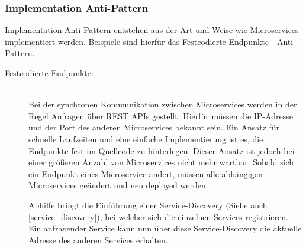 \subsubsection*{Implementation Anti-Pattern}


Implementation Anti-Pattern entstehen aus der Art und Weise wie Microservices implementiert werden. Beispiele sind hierfür das \glqq Festcodierte Endpunkte\grqq{} - Anti-Pattern.

\begin{description}




    
    
    \item[Festcodierte Endpunkte:]\hfill \\
    Bei der synchronen Kommunikation zwischen Microservices werden in der Regel Anfragen über REST APIs gestellt. Hierfür müssen die IP-Adresse und der Port des anderen Microservices bekannt sein. Ein Ansatz für schnelle Laufzeiten und eine einfache Implementierung ist es, die Endpunkte fest im Quellcode zu hinterlegen. Dieser Ansatz ist jedoch bei einer größeren Anzahl von Microservices nicht mehr wartbar. Sobald sich ein Endpunkt eines Microservice ändert, müssen alle abhängigen Microservices geändert und neu deployed werden.

    Abhilfe bringt die Einführung einer Service-Discovery (Siehe auch \autoref{service_discovery}), bei welcher sich die einzelnen Services registrieren. Ein anfragender Service kann nun über diese Service-Discovery die aktuelle Adresse des anderen Services erhalten.

\end{description}

